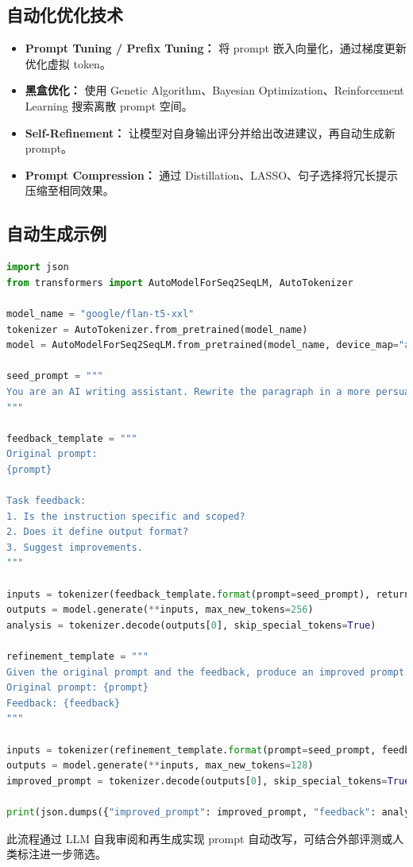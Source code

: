 \documentclass[UTF8,zihao=-4]{ctexart}
\begin{document}
\subsection{自动化优化技术}
\begin{itemize}
  \item \textbf{Prompt Tuning / Prefix Tuning：} 将 prompt 嵌入向量化，通过梯度更新优化虚拟 token。
  \item \textbf{黑盒优化：} 使用 Genetic Algorithm、Bayesian Optimization、Reinforcement Learning 搜索离散 prompt 空间。
  \item \textbf{Self-Refinement：} 让模型对自身输出评分并给出改进建议，再自动生成新 prompt。
  \item \textbf{Prompt Compression：} 通过 Distillation、LASSO、句子选择将冗长提示压缩至相同效果。
\end{itemize}

\subsection{自动生成示例}
\begin{lstlisting}[language=Python,caption={使用自反思自动生成新 Prompt}]
import json
from transformers import AutoModelForSeq2SeqLM, AutoTokenizer

model_name = "google/flan-t5-xxl"
tokenizer = AutoTokenizer.from_pretrained(model_name)
model = AutoModelForSeq2SeqLM.from_pretrained(model_name, device_map="auto")

seed_prompt = """
You are an AI writing assistant. Rewrite the paragraph in a more persuasive tone.
"""

feedback_template = """
Original prompt:
{prompt}

Task feedback:
1. Is the instruction specific and scoped?
2. Does it define output format?
3. Suggest improvements.
"""

inputs = tokenizer(feedback_template.format(prompt=seed_prompt), return_tensors="pt").to(model.device)
outputs = model.generate(**inputs, max_new_tokens=256)
analysis = tokenizer.decode(outputs[0], skip_special_tokens=True)

refinement_template = """
Given the original prompt and the feedback, produce an improved prompt.
Original prompt: {prompt}
Feedback: {feedback}
"""

inputs = tokenizer(refinement_template.format(prompt=seed_prompt, feedback=analysis), return_tensors="pt").to(model.device)
outputs = model.generate(**inputs, max_new_tokens=128)
improved_prompt = tokenizer.decode(outputs[0], skip_special_tokens=True)

print(json.dumps({"improved_prompt": improved_prompt, "feedback": analysis}, indent=2, ensure_ascii=False))
\end{lstlisting}
此流程通过 LLM 自我审阅和再生成实现 prompt 自动改写，可结合外部评测或人类标注进一步筛选。
\end{document}
